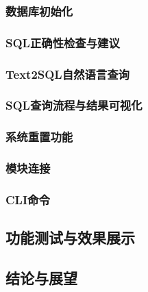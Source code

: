 \documentclass[10.5pt,compsoc,twocolumn]{CjC} %
\theoremstyle{mystyle}
\begin{document}
{\begin{CJK*}{UTF8}{zhhei}\subsubsection{数据库初始化}\end{CJK*}}

{\begin{CJK*}{UTF8}{zhhei}\subsubsection{SQL正确性检查与建议}\end{CJK*}}

{\begin{CJK*}{UTF8}{zhhei}\subsubsection{Text2SQL自然语言查询}\end{CJK*}}

{\begin{CJK*}{UTF8}{zhhei}\subsubsection{SQL查询流程与结果可视化}\end{CJK*}}

{\begin{CJK*}{UTF8}{zhhei}\subsubsection{系统重置功能}\end{CJK*}}

{\begin{CJK*}{UTF8}{zhhei}\subsubsection{模块连接}\end{CJK*}}

{\begin{CJK*}{UTF8}{zhhei}\subsubsection{CLI命令}\end{CJK*}}

{\begin{CJK*}{UTF8}{zhhei}\vskip 1mm\section{功能测试与效果展示}\end{CJK*}}

{\begin{CJK*}{UTF8}{zhhei}\vskip 1mm\section{结论与展望}\end{CJK*}}

\end{document}
